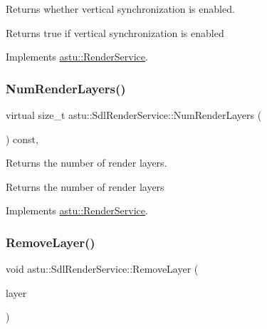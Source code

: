 Returns whether vertical synchronization is enabled.

\begin{DoxyReturn}{Returns}
{\ttfamily true} if vertical synchronization is enabled 
\end{DoxyReturn}


Implements \hyperlink{classastu_1_1RenderService_a63ee728bf462dcd71821b2104a1d631a}{astu\+::\+Render\+Service}.

\mbox{\label{classastu_1_1SdlRenderService_a45305851abdc94c0d9c8441822a59cd2}} 
\subsubsection{\texorpdfstring{Num\+Render\+Layers()}{NumRenderLayers()}}
{\footnotesize\ttfamily virtual size\+\_\+t astu\+::\+Sdl\+Render\+Service\+::\+Num\+Render\+Layers (\begin{DoxyParamCaption}{ }\end{DoxyParamCaption}) const\hspace{0.3cm}{\ttfamily [override]}, {\ttfamily [virtual]}}

Returns the number of render layers.

\begin{DoxyReturn}{Returns}
the number of render layers 
\end{DoxyReturn}


Implements \hyperlink{classastu_1_1RenderService_a2347b2ac2b5f57b79bad63de9b8e6841}{astu\+::\+Render\+Service}.

\mbox{\label{classastu_1_1SdlRenderService_ae275d41459e82b5e7cf6636b2b2f868a}} 
\subsubsection{\texorpdfstring{Remove\+Layer()}{RemoveLayer()}}
{\footnotesize\ttfamily void astu\+::\+Sdl\+Render\+Service\+::\+Remove\+Layer (\begin{DoxyParamCaption}\item[{\hyperlink{classastu_1_1ISdlRenderLayer}{I\+Sdl\+Render\+Layer} \&}]{layer }\end{DoxyParamCaption})}

